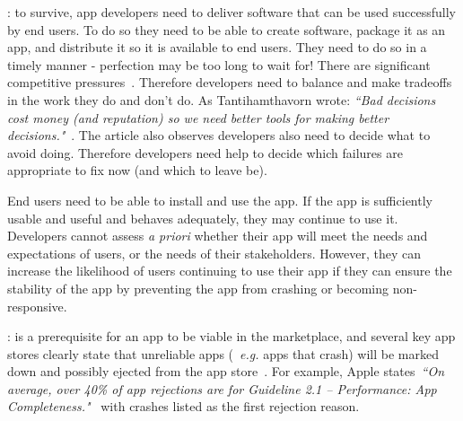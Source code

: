 : to survive, app developers need to deliver software that can be used successfully by end users. To do so they need to be able to create software, package it as an app, and distribute it so it is available to end users.
%
They need to do so in a timely manner - perfection may be too long to wait for! There are significant competitive pressures~. Therefore developers need to balance and make tradeoffs in the work they do and don't do. As Tantihamthavorn wrote: \emph{``Bad decisions cost money (and reputation) so we need better tools for making better decisions."}~. The article also observes developers also need to decide what to avoid doing. Therefore developers need help to decide which failures are appropriate to fix now (and which to leave be).

End users need to be able to install and use the app. If the app is sufficiently usable and useful and behaves adequately, they may continue to use it. Developers cannot assess \emph{a priori} whether their app will meet the needs and expectations of users, or the needs of their stakeholders. However, they can increase the likelihood of users continuing to use their app if they can ensure the stability of the app by preventing the app from crashing or becoming non-responsive. 

: is a prerequisite for an app to be viable in the marketplace, and several key app stores clearly state that unreliable apps (~\emph{e.g.} apps that crash) will be marked down and possibly ejected from the app store~. For example, Apple states~\emph{``On average, over 40\% of app rejections are for Guideline 2.1 – Performance: App Completeness."}~ with crashes listed as the first rejection reason. %

